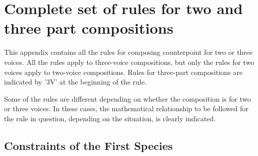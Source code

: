 \chapter{Complete set of rules for two and three part compositions}\label{appendix:complete-set-of-rule}
This appendix contains all the rules for composing counterpoint for two or three voices. All the rules apply to three-voice compositions, but only the rules for two voices apply to two-voice compositions. Rules for three-part compositions are indicated by '3V' at the beginning of the rule.


Some of the rules are different depending on whether the composition is for two or three voices. In these cases, the mathematical relationship to be followed for the rule in question, depending on the situation, is clearly indicated.
\section*{Constraints of the First Species}
